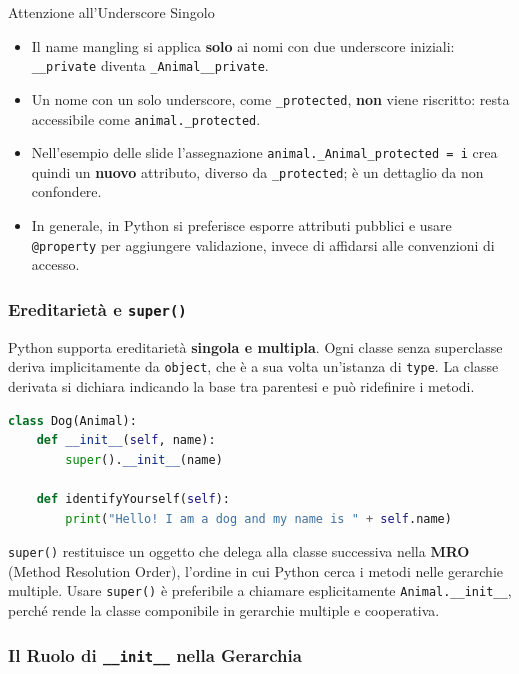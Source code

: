 \documentclass[12pt]{extarticle}
\begin{document}
\begin{cbox}{Attenzione all'Underscore Singolo}
\begin{itemize}
    \item Il name mangling si applica \textbf{solo} ai nomi con due underscore iniziali: \texttt{\_\_private} diventa \texttt{\_Animal\_\_private}.
    \item Un nome con un solo underscore, come \texttt{\_protected}, \textbf{non} viene riscritto: resta accessibile come \texttt{animal.\_protected}.
    \item Nell'esempio delle slide l'assegnazione \texttt{animal.\_Animal\_protected = i} crea quindi un \textbf{nuovo} attributo, diverso da \texttt{\_protected}; è un dettaglio da non confondere.
    \item In generale, in Python si preferisce esporre attributi pubblici e usare \texttt{@property} per aggiungere validazione, invece di affidarsi alle convenzioni di accesso.
\end{itemize}
\end{cbox}

\subsubsection{Ereditarietà e \texttt{super()}}

\noindent Python supporta ereditarietà \textbf{singola e multipla}. Ogni classe senza superclasse deriva implicitamente da \texttt{object}, che è a sua volta un'istanza di \texttt{type}. La classe derivata si dichiara indicando la base tra parentesi e può ridefinire i metodi.

\begin{lstlisting}[language=Python]
class Dog(Animal):
    def __init__(self, name):
        super().__init__(name)

    def identifyYourself(self):
        print("Hello! I am a dog and my name is " + self.name)
\end{lstlisting}

\noindent \texttt{super()} restituisce un oggetto che delega alla classe successiva nella \textbf{MRO} (Method Resolution Order), l'ordine in cui Python cerca i metodi nelle gerarchie multiple. Usare \texttt{super()} è preferibile a chiamare esplicitamente \texttt{Animal.\_\_init\_\_}, perché rende la classe componibile in gerarchie multiple e cooperativa.

\subsubsection{Il Ruolo di \texttt{\_\_init\_\_} nella Gerarchia}
\end{document}
